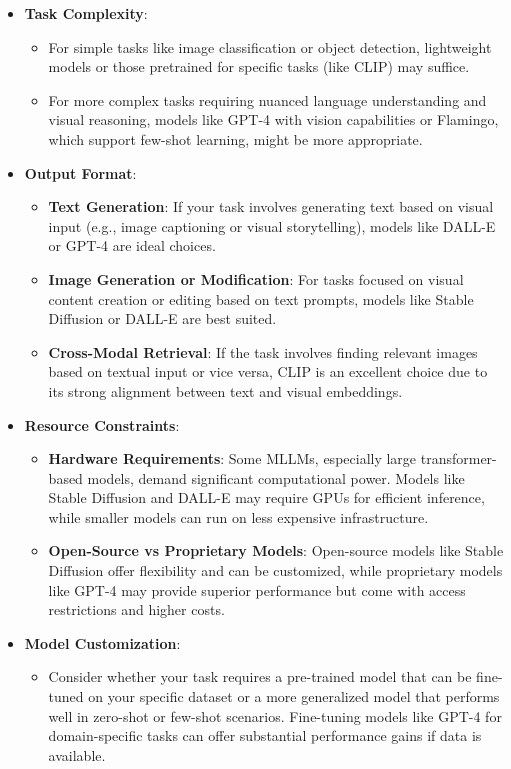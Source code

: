 \begin{itemize}
    \item \textbf{Task Complexity}:
    \begin{itemize}
        \item For simple tasks like image classification or object detection, lightweight models or those pretrained for specific tasks (like CLIP) may suffice.
        \item For more complex tasks requiring nuanced language understanding and visual reasoning, models like GPT-4 with vision capabilities or Flamingo, which support few-shot learning, might be more appropriate.
    \end{itemize}
    \item \textbf{Output Format}:
    \begin{itemize}
        \item \textbf{Text Generation}: If your task involves generating text based on visual input (e.g., image captioning or visual storytelling), models like DALL-E or GPT-4 are ideal choices.
        \item \textbf{Image Generation or Modification}: For tasks focused on visual content creation or editing based on text prompts, models like Stable Diffusion or DALL-E are best suited.
        \item \textbf{Cross-Modal Retrieval}: If the task involves finding relevant images based on textual input or vice versa, CLIP is an excellent choice due to its strong alignment between text and visual embeddings.
    \end{itemize}
    \item \textbf{Resource Constraints}:
    \begin{itemize}
        \item \textbf{Hardware Requirements}: Some MLLMs, especially large transformer-based models, demand significant computational power. Models like Stable Diffusion and DALL-E may require GPUs for efficient inference, while smaller models can run on less expensive infrastructure.
        \item \textbf{Open-Source vs Proprietary Models}: Open-source models like Stable Diffusion offer flexibility and can be customized, while proprietary models like GPT-4 may provide superior performance but come with access restrictions and higher costs.
    \end{itemize}
    \item \textbf{Model Customization}:
    \begin{itemize}
        \item Consider whether your task requires a pre-trained model that can be fine-tuned on your specific dataset or a more generalized model that performs well in zero-shot or few-shot scenarios. Fine-tuning models like GPT-4 for domain-specific tasks can offer substantial performance gains if data is available.
    \end{itemize}
\end{itemize}

